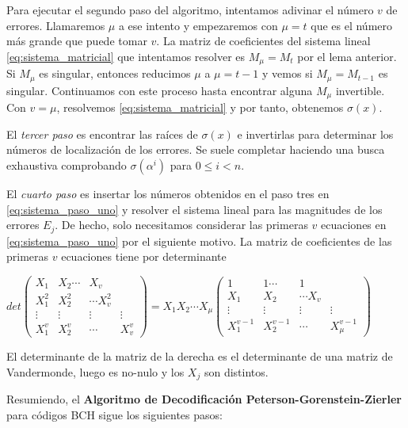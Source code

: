 Para ejecutar el segundo paso del algoritmo, intentamos adivinar el número $v$ de errores. Llamaremos $\mu$ a ese intento y empezaremos con $\mu = t$ que es el número más grande que puede tomar $v$. La matriz de coeficientes del sistema lineal \ref{eq:sistema_matricial} que intentamos resolver es $M_\mu = M_t$ por el lema anterior. Si $M_\mu$ es singular, entonces reducimos $\mu$ a $\mu = t-1$ y vemos si $M_\mu = M_{t-1}$ es singular. Continuamos con este proceso hasta encontrar alguna $M_\mu$ invertible. Con $v = \mu$, resolvemos \ref{eq:sistema_matricial} y por tanto, obtenemos $\sigma(x)$. 

El \textit{tercer paso} es encontrar las raíces de $\sigma(x)$ e invertirlas para determinar los números de localización de los errores. Se suele completar haciendo una busca exhaustiva comprobando $\sigma(\alpha^i)$ para $ 0 \leq i < n$.

El \textit{cuarto paso} es insertar los números obtenidos en el paso tres en \ref{eq:sistema_paso_uno} y resolver el sistema lineal para las magnitudes de los errores $E_j$. De hecho, solo necesitamos considerar las primeras $v$ ecuaciones en \ref{eq:sistema_paso_uno} por el siguiente motivo. La matriz de coeficientes de las primeras $v$ ecuaciones tiene por determinante 


$det \begin{pmatrix}
			X_1 & X_2  \cdots &  X_v \\
			X_1^2 & X_2^2  & \cdots  X_v^2 \\
 			\vdots & \vdots & \vdots & \vdots  \\
			X_1^v & X_2^v & \cdots & X_v^v 
	\end{pmatrix} = X_1X_2\cdots X_\mu \begin{pmatrix}
			1 & 1  \cdots &  1 \\
			X_1 & X_2  & \cdots  X_v \\
 			\vdots & \vdots & \vdots & \vdots  \\
			X_1^{v-1} & X_2^{v-1} & \cdots & X_\mu^{v-1} 
	\end{pmatrix}  $

El determinante de la matriz de la derecha es el determinante de una matriz de Vandermonde, luego es no-nulo y los $X_j$ son distintos.


Resumiendo, el \textbf{Algoritmo de Decodificación Peterson-Gorenstein-Zierler} para códigos BCH sigue los siguientes pasos: 

